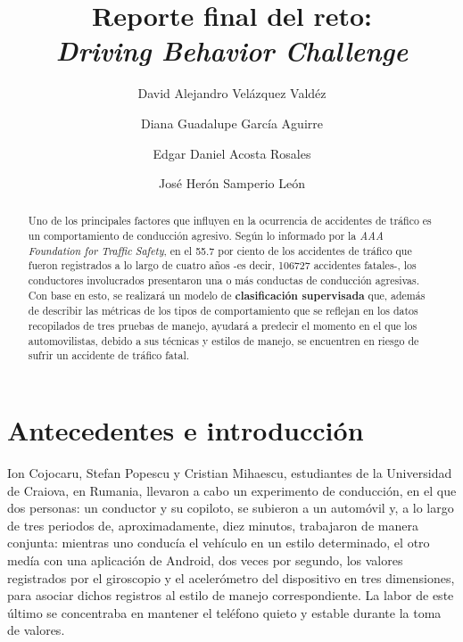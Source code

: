 \documentclass[runningheads]{llncs}
\begin{document}
%
\title{Reporte final del reto: \\
\textit{Driving Behavior Challenge}}
%
%
\author{David Alejandro Velázquez Valdéz \and
Diana Guadalupe García Aguirre \and
Edgar Daniel Acosta Rosales \and
José Herón Samperio León 
}
%

%
%

\maketitle              %
%
\begin{abstract}
\textsc Uno de los principales factores que influyen en la ocurrencia de accidentes de tráfico es un comportamiento de conducción agresivo. Según lo informado por la \textit{AAA Foundation for Traffic Safety}, en el 55.7 por ciento de los accidentes de tráfico que fueron registrados a lo largo de cuatro años -es decir, 106727 accidentes fatales-, los conductores involucrados presentaron una o más conductas de conducción agresivas. Con base en esto, se realizará un modelo de \textbf{clasificación supervisada} que, además de describir las métricas de los tipos de comportamiento que se reflejan en los datos recopilados de tres pruebas de manejo, ayudará a predecir el momento en el que los automovilistas, debido a sus técnicas y estilos de manejo, se encuentren en riesgo de sufrir un accidente de tráfico fatal. \\

\end{abstract}
%
%
%
\section{Antecedentes e introducción}
\textsc Ion Cojocaru, Stefan Popescu y Cristian Mihaescu, estudiantes de la Universidad de Craiova, en Rumania, llevaron a cabo un experimento de conducción, en el que dos personas: un conductor y su copiloto, se subieron a un automóvil y, a lo largo de tres periodos de, aproximadamente, diez minutos, trabajaron de manera conjunta: mientras uno conducía el vehículo en un estilo determinado, el otro medía con una aplicación de Android, dos veces por segundo, los valores registrados por el giroscopio y el acelerómetro del dispositivo en tres dimensiones, para asociar dichos registros al estilo de manejo correspondiente. La labor de este último se concentraba en mantener el teléfono quieto y estable durante la toma de valores.\\
\end{document}

